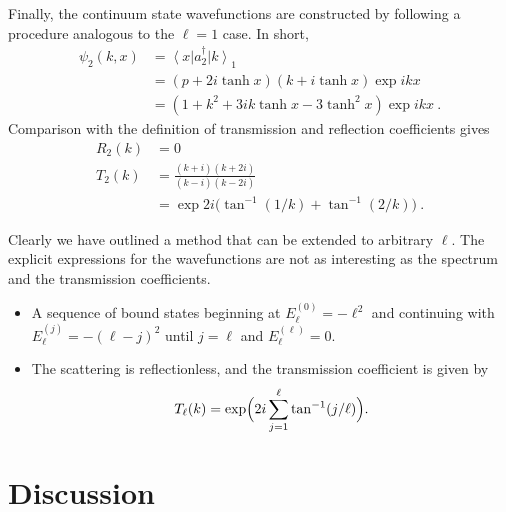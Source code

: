 \documentclass[12pt,twoside]{article}
\newcommand{\bra}[1]{\left\langle #1 \right|}
\newcommand{\ket}[1]{\left|#1\right\rangle}
\begin{document}
Finally, the continuum state wavefunctions are constructed by following a procedure analogous to the $\ell=1$ case.  In short,
%
\begin{align}
  \psi_2(k,x) &=  \bra x  a_2^\dagger \ket k_1\nonumber\\
  &= (p+2i\tanh x)(k+i\tanh x)\exp ikx\nonumber\\
  &=  (1+k^2 +3ik\tanh x -3\tanh^2x)\exp ikx\ .
  \label{3.15}
\end{align}
%
Comparison with the definition of transmission and reflection coefficients gives %
\begin{align}
  R_2(k) &= 0\nonumber\\
  T_2(k) &= \frac{(k+i)(k+2i)}{(k-i)(k-2i)}\nonumber\\
  &=  \exp 2i \bigl(\tan^{-1}(1/k) + \tan^{-1}(2/k)\bigr)\ .
  \label{3.16}
\end{align}
%

Clearly we have outlined a method that can be extended to arbitrary $\ell$.  The explicit expressions for the wavefunctions are not as interesting as the spectrum and the transmission coefficients.
\begin{itemize}
  \item
  A sequence of bound states beginning at $E_\ell ^{(0)} =   -\ell^2$ and continuing with $E_\ell^{(j)}=-(\ell - j)^2$   until $j=\ell$ and $E_\ell^{(\ell)}=0$.
  \item
  The scattering is reflectionless, and the transmission coefficient   is given by   %
  \begin{equation}
    T_\ell (k) = \exp\Bigl(2i \sum_{j=1}^\ell \tan^{-1}(j/\ell)\Bigr).
	\label{3.17}
  \end{equation}
\end{itemize}

\section{Discussion}
\end{document}
